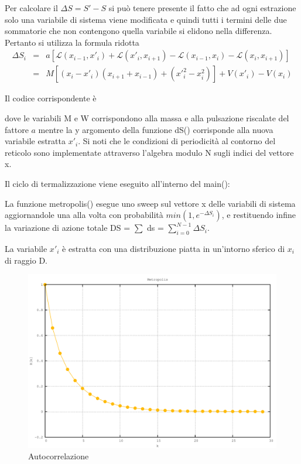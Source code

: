 \documentclass[a4paper,11pt]{report}
\begin{document}
Per calcolare il $\Delta S = S'-S$ si può tenere presente il fatto che ad ogni estrazione solo una variabile di sistema viene modificata e quindi tutti i termini delle due sommatorie che non contengono quella variabile si elidono nella differenza. Pertanto si utilizza la formula ridotta
\begin{eqnarray*}
 \Delta S_i &=& a[\mathcal{L}(x_{i-1},x'_{i})+\mathcal{L}(x'_{i},x_{i+1})-\mathcal{L}(x_{i-1},x_{i})-\mathcal{L}(x_{i},x_{i+1})]\\
   &=& M[(x_{i}-x'_{i})(x_{i+1}+x_{i-1})+(x'^2_i-x^2_i)]+V(x'_i)-V(x_i)
\end{eqnarray*}

Il codice corrispondente è

dove le variabili {\ttfamily M} e {\ttfamily W} corrispondono alla massa e alla pulsazione riscalate del fattore $a$ mentre la {\ttfamily y} argomento della funzione {\ttfamily dS()} corrisponde alla nuova variabile estratta $x'_{i}$. Si noti che le condizioni di periodicità al contorno del reticolo sono implementate attraverso l'algebra modulo N sugli indici del vettore {\ttfamily x}.

Il ciclo di termalizzazione viene eseguito all'interno del {\ttfamily main()}:

La funzione {\ttfamily metropolis()} esegue uno sweep sul vettore {\ttfamily x} delle variabili di sistema aggiornandole una alla volta con probabilità $min(1,e^{-\Delta S_i})$, e restituendo infine la variazione di azione totale {\ttfamily DS} = {\ttfamily $\sum$ ds} = $\sum^{N-1}_{i=0}\Delta S_i$.

La variabile $x'_i$ è estratta con una distribuzione piatta in un'intorno sferico di $x_i$ di raggio {\ttfamily D}.

\begin{figure}[h]
\centering
\includegraphics[width=\textwidth]{autocorrelation}
\caption{Autocorrelazione}
\label{fig:autocorrelation}
\end{figure}
\end{document}
